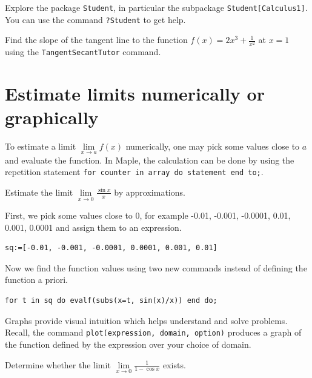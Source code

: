 \documentclass[en,11pt,simple]{elegantbook}
\let\BeginKnitrBlock\begin \let\EndKnitrBlock\end
\begin{document}
\BeginKnitrBlock{exercise}{}{}
\protect\hypertarget{exr:unnamed-chunk-13}{}{\label{exr:unnamed-chunk-13} }Explore the package \texttt{Student}, in particular the subpackage \texttt{Student{[}Calculus1{]}}.
You can use the command \texttt{?Student} to get help.

Find the slope of the tangent line to the function \(f(x)=2x^3+\frac1{x^2}\) at \(x=1\) using the \texttt{TangentSecantTutor} command.
\EndKnitrBlock{exercise}

\hypertarget{estimate-limits-numerically-or-graphically}{%
\section{Estimate limits numerically or graphically}\label{estimate-limits-numerically-or-graphically}}

To estimate a limit \(\lim\limits_{x\to a}f(x)\) numerically, one may pick some values close to \(a\) and evaluate the function. In Maple, the calculation can be done by using the repetition statement \texttt{for\ counter\ in\ array\ do\ statement\ end\ to;}.

\BeginKnitrBlock{example}{}{}
\protect\hypertarget{exm:unnamed-chunk-14}{}{\label{exm:unnamed-chunk-14} }Estimate the limit \(\lim\limits_{x\to 0}\frac{\sin x}{x}\) by approximations.
\EndKnitrBlock{example}

\BeginKnitrBlock{solution}{}{}
{}
First, we pick some values close to 0, for example -0.01, -0.001, -0.0001, 0.01, 0.001, 0.0001 and assign them to an expression.

\begin{verbatim}
sq:=[-0.01, -0.001, -0.0001, 0.0001, 0.001, 0.01]
\end{verbatim}

Now we find the function values using two new commands instead of defining the function a priori.

\begin{verbatim}
for t in sq do evalf(subs(x=t, sin(x)/x)) end do;
\end{verbatim}
\EndKnitrBlock{solution}

Graphs provide visual intuition which helps understand and solve problems. Recall, the command \texttt{plot(expression,\ domain,\ option)} produces a graph of the function defined by the expression over your choice of domain.

\BeginKnitrBlock{example}{}{}
\protect\hypertarget{exm:unnamed-chunk-16}{}{\label{exm:unnamed-chunk-16} }
Determine whether the limit \(\lim\limits_{x\to 0}\frac{1}{1- \cos x}\) exists.
\EndKnitrBlock{example}
\end{document}
